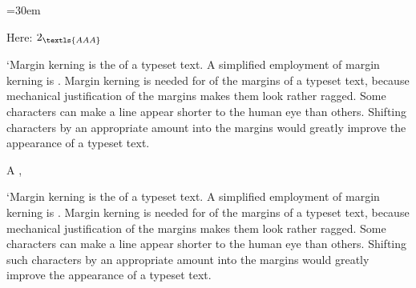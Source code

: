 
\beginpackages
{}
   \usepackage[letterspace=250]{letterspace}
   \usepackage{soul}
\endpackages

\setprotcode\font
\hsize=30em

Here: $2_{\textls{AAA}}$

 `Margin kerning is the  of a
  typeset text. A simplified employment of margin kerning is . Margin kerning is needed for  of the margins
  of a typeset text, because mechanical justification of the margins makes
  them look rather ragged. Some characters can make a line appear shorter to
  the human eye than others. Shifting  characters by an appropriate
  amount into the margins would greatly improve the appearance of a typeset
  text.

A   ,

\vfill \eject

 `Margin kerning is the  of a
  typeset text. A simplified employment of margin kerning is . Margin kerning is needed for  of the margins
  of a typeset text, because mechanical justification of the margins makes
  them look rather ragged. Some characters can make a line appear shorter to
  the human eye than others. Shifting such characters by an appropriate
  amount into the margins would greatly improve the appearance of a typeset
  text.

\bye
